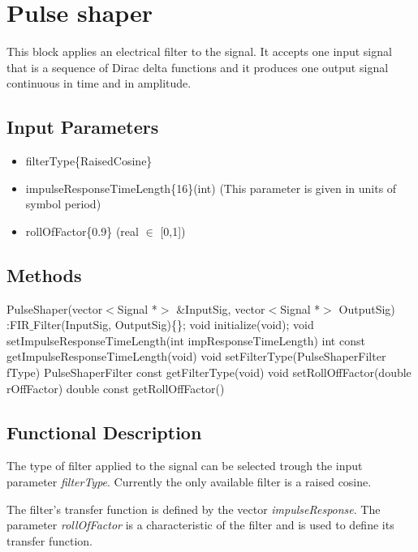 \clearpage

\section{Pulse shaper}

This block applies an electrical filter to the signal. It accepts one input signal that is a sequence of Dirac delta functions and it produces one output signal continuous in time and in amplitude.

\subsection*{Input Parameters}

\begin{itemize}
	\item filterType\{RaisedCosine\} \linebreak
	\item impulseResponseTimeLength\{16\}\linebreak (int) 
	\linebreak (This parameter is given in units of symbol period)
	\item rollOfFactor\{0.9\} \linebreak
	(real $\in$ [0,1])
\end{itemize}

\subsection*{Methods}

PulseShaper(vector$<$Signal *$>$ \&InputSig, vector$<$Signal *$>$ OutputSig) :FIR$\_$Filter(InputSig, OutputSig)\{\};
\bigbreak	
void initialize(void);
\bigbreak	
void setImpulseResponseTimeLength(int impResponseTimeLength)
\bigbreak
int const getImpulseResponseTimeLength(void)
\bigbreak	
void setFilterType(PulseShaperFilter fType)
\bigbreak
PulseShaperFilter const getFilterType(void)
\bigbreak	
void setRollOffFactor(double rOffFactor)
\bigbreak
double const getRollOffFactor()

\subsection*{Functional Description}

The type of filter applied to the signal can be selected trough the input parameter \textit{filterType}. Currently the only available filter is a raised cosine.

The filter's transfer function is defined by the vector \textit{impulseResponse}. The parameter \textit{rollOfFactor} is a characteristic of the filter and is used to define its transfer function.

